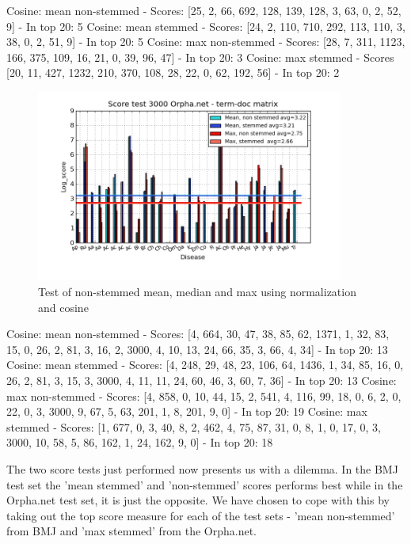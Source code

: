 Cosine: mean non-stemmed - Scores: [25, 2, 66, 692, 128, 139, 128, 3, 63, 0, 2, 52, 9] - In top 20: 5
Cosine: mean stemmed - Scores: [24, 2, 110, 710, 292, 113, 110, 3, 38, 0, 2, 51, 9] - In top 20: 5
Cosine: max non-stemmed - Scores: [28, 7, 311, 1123, 166, 375, 109, 16, 21, 0, 39, 96, 47] - In top 20: 3
Cosine: max stemmed - Scores [20, 11, 427, 1232, 210, 370, 108, 28, 22, 0, 62, 192, 56] - In top 20: 2


\begin{figure}[h!]
        \begin{center}
          \includegraphics[width=0.9\textwidth]{barcharts/termDoc_orphan_hist_3000_ns_mea_s_mea_ns_max_s_max.png}
        \end{center}
        \caption{Test of non-stemmed mean, median and max using normalization and cosine}
        \label{termDoc_orphan_hist_3000_ns_mea_s_mea_ns_max_s_max}
\end{figure}

 
Cosine: mean non-stemmed - Scores: [4, 664, 30, 47, 38, 85, 62, 1371, 1, 32, 83, 15, 0, 26, 2, 81, 3, 16, 2, 3000, 4, 10, 13, 24, 66, 35, 3, 66, 4, 34] - In top 20: 13
Cosine: mean stemmed - Scores: [4, 248, 29, 48, 23, 106, 64, 1436, 1, 34, 85, 16, 0, 26, 2, 81, 3, 15, 3, 3000, 4, 11, 11, 24, 60, 46, 3, 60, 7, 36] - In top 20: 13
Cosine: max non-stemmed - Scores: [4, 858, 0, 10, 44, 15, 2, 541, 4, 116, 99, 18, 0, 6, 2, 0, 22, 0, 3, 3000, 9, 67, 5, 63, 201, 1, 8, 201, 9, 0] - In top 20: 19
Cosine: max stemmed - Scores: [1, 677, 0, 3, 40, 8, 2, 462, 4, 75, 87, 31, 0, 8, 1, 0, 17, 0, 3, 3000, 10, 58, 5, 86, 162, 1, 24, 162, 9, 0] - In top 20: 18

The two score tests just performed now presents us with a dilemma. In the BMJ test set the 'mean stemmed' and 'non-stemmed' scores performs best while in the Orpha.net test set, it is just the opposite. We have chosen to cope with this by taking out the top score measure for each of the test sets - 'mean non-stemmed' from BMJ and 'max stemmed' from the Orpha.net. 

